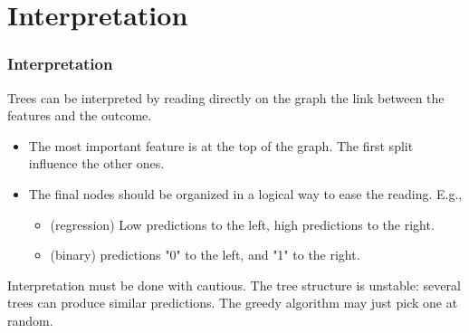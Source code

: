 \section{Interpretation}
\begin{frame}
\frametitle{Interpretation}
Trees can be interpreted by reading directly on the graph the link between the features and the outcome.
\begin{itemize}
\item The most important feature is at the top of the graph. The first split influence the other ones.
\item The final nodes should be organized in a logical way to ease the reading. E.g., 
\begin{itemize}
\item (regression) Low predictions to the left, high predictions to the right.
\item (binary) predictions "0" to the left, and "1" to the right.
\end{itemize}
\end{itemize}
Interpretation must be done with cautious. The tree structure is unstable: several trees can produce similar predictions. The greedy algorithm may just pick one at random.
\end{frame}
